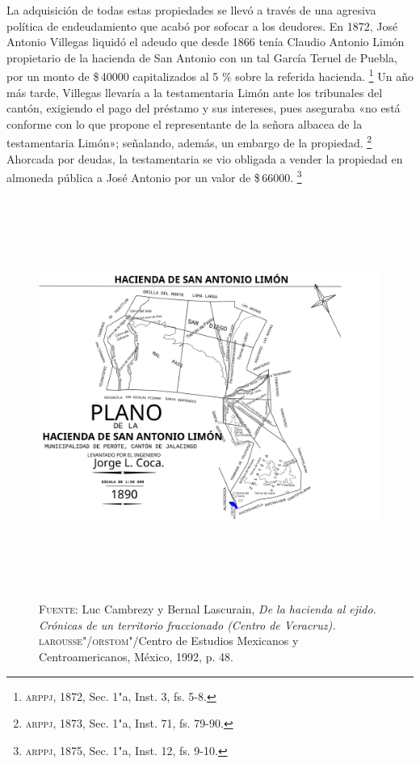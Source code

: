 \documentclass[14pt,twoside,final]{extbook} %
\let\oldfootnote\footnote
\renewcommand\footnote[1]{%
\oldfootnote{\hspace{1mm}#1}}
\begin{document}
La adquisición de todas estas propiedades se llevó a través de una agresiva política de endeudamiento que acabó por sofocar a los deudores. En 1872, José Antonio Villegas liquidó el adeudo que desde 1866 tenía Claudio Antonio Limón propietario de la hacienda de San Antonio con un tal García Teruel de Puebla, por un monto de \$\,40000 capitalizados al 5 \% sobre la referida hacienda.\footnote{\textsc{arppj}, 1872, Sec. 1"a, Inst. 3, fs. 5-8.} Un año más tarde, Villegas llevaría a la testamentaria Limón ante los tribunales del cantón, exigiendo el pago del préstamo y sus intereses, pues aseguraba «no está conforme con lo que propone el representante de la señora albacea de la testamentaria Limón»; señalando, además, un embargo de la propiedad.\footnote{\textsc{arppj}, 1873, Sec. 1"a, Inst. 71, fs. 79-90.} Ahorcada por deudas, la testamentaria se vio obligada a vender la propiedad en almoneda pública a José Antonio por un valor de \$\,66000.\footnote{\textsc{arppj}, 1875, Sec. 1"a, Inst. 12, fs. 9-10.}
\begin{figure}
\centering
\includegraphics[height=13.1cm]{limon}
\caption[Plano de la hacienda de San Antonio Limón]{\textsc{Fuente:} Luc Cambrezy y Bernal Lascurain, \emph{De la hacienda al ejido. Crónicas de un territorio fraccionado (Centro de Veracruz).} \textsc{larousse"/orstom}"/Centro de Estudios Mexicanos y Centroamericanos, México, 1992, p. 48.}
\label{fig:hda-limon}
\end{figure}
\end{document}
